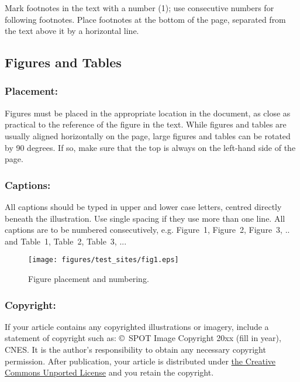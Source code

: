 \documentclass{isprs} %
\begin{document}
Mark footnotes in the text with a number (1); use consecutive numbers for following footnotes. Place footnotes at the bottom of the page, separated from the text above it by a horizontal line.


\subsection{Figures and Tables}\label{sec:Illustrations and Tables}

\subsubsection{Placement:}\label{sec:Placement}

Figures must be placed in the appropriate location in the document, as close as practical to the reference of the figure in the text. While figures and tables are usually aligned horizontally on the page, large figures and tables can be rotated by 90 degrees. If so, make sure that the top is always on the left-hand side of the page.

\subsubsection{Captions:}\label{sec:Captions}

All captions should be typed in upper and lower case letters,
centred directly beneath the illustration. Use single spacing if they
use more than one line. All captions are to be numbered consecutively,
e.g. Figure~1, Figure~2, Figure~3, ..  and Table~1, Table~2, Table~3, ...

\begin{figure}[ht!]
\begin{center}
		\texttt{[image: figures/test\_sites/fig1.eps]}
	\caption{Figure placement and numbering.}
\label{fig:figure_placement}
\end{center}
\end{figure}


\subsubsection{Copyright:}\label{sec:Copyright}

If your article contains any copyrighted illustrations or imagery,
include a statement of copyright such as: \copyright~SPOT Image Copyright 20xx
(fill in year), CNES\@. It is the author's responsibility to obtain any necessary
copyright permission. After publication, your article is distributed under \underline{the Creative
Commons Unported License} and you retain the copyright.
\end{document}
